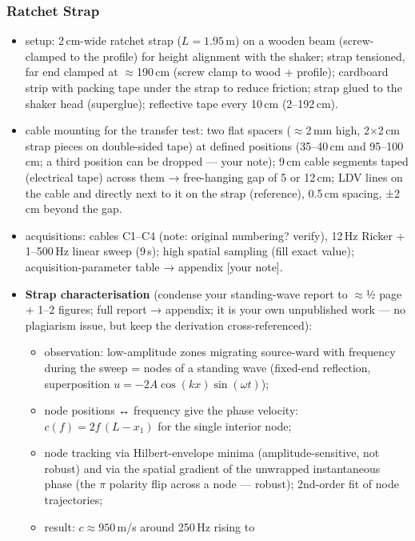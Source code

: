 \subsubsection{Ratchet Strap}
\begin{itemize}
  \item [KEEP] setup: 2\,cm-wide ratchet strap ($L = 1.95$\,m) on a wooden
    beam (screw-clamped to the profile) for height alignment with the
    shaker; strap tensioned, far end clamped at $\approx$190\,cm
    (screw clamp to wood + profile); cardboard strip with packing tape under
    the strap to reduce friction; strap glued to the shaker head
    (superglue); reflective tape every 10\,cm (2–192\,cm).
  \item [KEEP] cable mounting for the transfer test: two flat spacers
    ($\approx$2\,mm high, 2$\times$2\,cm strap pieces on double-sided tape)
    at defined positions (35–40\,cm and 95–100\,cm; a third position can be
    dropped — your note); 9\,cm cable segments taped (electrical tape)
    across them → free-hanging gap of 5 or 12\,cm; LDV lines on the cable
    and directly next to it on the strap (reference), 0.5\,cm spacing,
    ±2\,cm beyond the gap.
  \item [KEEP] acquisitions: cables C1–C4 (note: original numbering? verify),
    12\,Hz Ricker + 1–500\,Hz linear sweep (9\,s); high spatial sampling
    (fill exact value); acquisition-parameter table → appendix [your note].
  \item \textbf{Strap characterisation} (condense your standing-wave report
    to $\approx$½ page + 1–2 figures; full report → appendix; it is your
    own unpublished work — no plagiarism issue, but keep the derivation
    cross-referenced):
    \begin{itemize}
      \item observation: low-amplitude zones migrating source-ward with
        frequency during the sweep = nodes of a standing wave (fixed-end
        reflection, superposition $u = -2A\cos(kx)\sin(\omega t)$);
      \item node positions ↔ frequency give the phase velocity:
        $c(f) = 2f\,(L - x_1)$ for the single interior node;
      \item node tracking via Hilbert-envelope minima (amplitude-sensitive,
        not robust) and via the spatial gradient of the unwrapped
        instantaneous phase (the $\pi$ polarity flip across a node —
        robust); 2nd-order fit of node trajectories;
      \item result: $c \approx 950$\,m/s around 250\,Hz rising to

\end{itemize}
\end{itemize}
